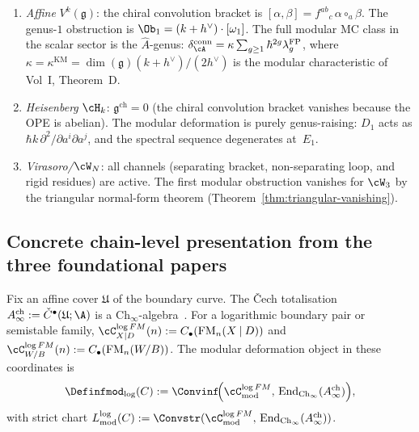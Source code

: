 \begin{computation}
\label{comp:genus-completion-standard}
\begin{enumerate}[label=\textup{(\alph*)}]
\item \emph{Affine} $V^k(\mathfrak{g})$:
 the chiral convolution bracket is
 $[\alpha,\beta] = f^{ab}{}_c\, \alpha \circ_a \beta$.
 The genus-$1$ obstruction is
 $\Ob_1 = (k + h^\vee) \cdot [\omega_1]$.
The full modular MC class in the scalar sector is the
$\hat{A}$-genus:
 $\delta_\cA^{\mathrm{conn}}
 = \kappa\sum_{g \ge 1} \hbar^{2g} \lambda_g^{\mathrm{FP}}$,
 where $\kappa = \kappa^{\mathrm{KM}} = \dim(\mathfrak{g})(k+h^\vee)/(2h^\vee)$
 is the modular characteristic of Vol~I, Theorem~D.

\item \emph{Heisenberg} $\cH_k$:
 $\mathfrak{g}^{\mathrm{ch}} = 0$ (the chiral convolution
 bracket vanishes because the OPE is abelian). The modular
 deformation is purely genus-raising:
 $D_1$ acts as $\hbar k\, \partial^2/\partial a^i \partial a^j$,
 and the spectral sequence degenerates at~$E_1$.

\item \emph{Virasoro/\/$\cW_N$}:
 all channels (separating bracket, non-separating loop, and
 rigid residues) are active. The first modular obstruction
 vanishes for $\cW_3$ by the triangular normal-form theorem
 (Theorem~\ref{thm:triangular-vanishing}).
\end{enumerate}
\end{computation}

\subsection{Concrete chain-level presentation from the three foundational papers}
\label{subsec:vol2-three-preprints-chain-level}

\begin{construction}
\label{const:vol2-three-preprints-chain-level}
Fix an affine cover $\mathfrak U$ of the boundary curve.
The \v{C}ech totalisation
$A^{\mathrm{ch}}_\infty := \check C^\bullet(\mathfrak U;\A)$
is a $\mathrm{Ch}_\infty$-algebra~\cite[Theorem~3.1]{MS24}.
For a logarithmic boundary pair or semistable family,
$\cC^{\log FM}_{X\mathbin{|}D}(n):=C_\bullet(\operatorname{FM}_n(X\mathbin{|}D))$
and $\cC^{\log FM}_{W/B}(n):=C_\bullet(\operatorname{FM}_n(W/B))$.
The modular deformation object in these coordinates is
\[
{\Definfmod}_{\log}(C)
:=
\Convinf\!\Bigl(
\cC^{\log FM}_{\mathrm{mod}},\,
\operatorname{End}_{\mathrm{Ch}_\infty}(A^{\mathrm{ch}}_\infty)
\Bigr),
\]
with strict chart
$L^{\log}_{\mathrm{mod}}(C)
:=
\Convstr(\cC^{\log FM}_{\mathrm{mod}},\,
\operatorname{End}_{\mathrm{Ch}_\infty}(A^{\mathrm{ch}}_\infty))$.
\end{construction}

